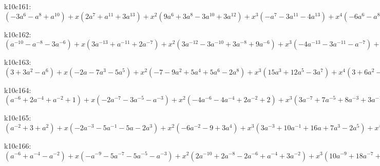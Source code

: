 k10c161: $ (-3a^{6}-a^{8}+a^{10}) +x(2a^{7}+a^{11}+3a^{13}) +x^{2}(9a^{6}+3a^{8}-3a^{10}+3a^{12}) +x^{3}(-a^{7}-3a^{11}-4a^{13}) +x^{4}(-6a^{6}-a^{8}+a^{10}-4a^{12}) +x^{5}(a^{11}+a^{13}) +x^{6}(a^{6}+a^{12}) $

k10c162: $ (a^{-10}-a^{-8}-3a^{-6}) +x(3a^{-13}+a^{-11}+2a^{-7}) +x^{2}(3a^{-12}-3a^{-10}+3a^{-8}+9a^{-6}) +x^{3}(-4a^{-13}-3a^{-11}-a^{-7}) +x^{4}(-4a^{-12}+a^{-10}-a^{-8}-6a^{-6}) +x^{5}(a^{-13}+a^{-11}) +x^{6}(a^{-12}+a^{-6}) $

k10c163: $ (3+3a^{2}-a^{6}) +x(-2a-7a^{3}-5a^{5}) +x^{2}(-7-9a^{2}+5a^{4}+5a^{6}-2a^{8}) +x^{3}(15a^{3}+12a^{5}-3a^{7}) +x^{4}(3+6a^{2}-4a^{4}-6a^{6}+a^{8}) +x^{5}(-a-11a^{3}-8a^{5}+2a^{7}) +x^{6}(-2a^{2}+a^{4}+3a^{6}) +x^{7}(a+4a^{3}+3a^{5}) +x^{8}(a^{2}+a^{4}) $

k10c164: $ (a^{-6}+2a^{-4}+a^{-2}+1) +x(-2a^{-7}-3a^{-5}-a^{-3}) +x^{2}(-4a^{-6}-4a^{-4}+2a^{-2}+2) +x^{3}(3a^{-7}+7a^{-5}+8a^{-3}+3a^{-1}-a) +x^{4}(4a^{-6}+a^{-4}-11a^{-2}-8) +x^{5}(-4a^{-5}-15a^{-3}-10a^{-1}+a) +x^{6}(a^{-6}+3a^{-2}+4) +x^{7}(3a^{-5}+8a^{-3}+5a^{-1}) +x^{8}(2a^{-4}+2a^{-2}) $

k10c165: $ (a^{-2}+3+a^{2}) +x(-2a^{-3}-5a^{-1}-5a-2a^{3}) +x^{2}(-6a^{-2}-9+3a^{4}) +x^{3}(3a^{-3}+10a^{-1}+16a+7a^{3}-2a^{5}) +x^{4}(4a^{-2}+8-3a^{2}-7a^{4}) +x^{5}(-6a^{-1}-17a-10a^{3}+a^{5}) +x^{6}(a^{-2}-3-a^{2}+3a^{4}) +x^{7}(3a^{-1}+7a+4a^{3}) +x^{8}(2+2a^{2}) $

k10c166: $ (a^{-6}+a^{-4}-a^{-2}) +x(-a^{-9}-5a^{-7}-5a^{-5}-a^{-3}) +x^{2}(2a^{-10}+2a^{-8}-2a^{-6}+a^{-4}+3a^{-2}) +x^{3}(10a^{-9}+18a^{-7}+11a^{-5}+3a^{-3}) +x^{4}(-3a^{-10}-2a^{-8}-2a^{-6}-3a^{-4}) +x^{5}(-11a^{-9}-22a^{-7}-10a^{-5}+a^{-3}) +x^{6}(a^{-10}-4a^{-8}-2a^{-6}+3a^{-4}) +x^{7}(3a^{-9}+7a^{-7}+4a^{-5}) +x^{8}(2a^{-8}+2a^{-6}) $

